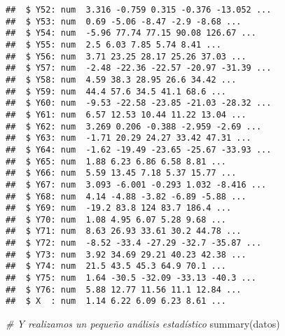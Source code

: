 \documentclass[
]{article}
\newenvironment{Shaded}{\begin{snugshade}}{\end{snugshade}}
\newcommand{\CommentTok}[1]{\textcolor[rgb]{0.56,0.35,0.01}{\textit{#1}}}
\newcommand{\FunctionTok}[1]{\textcolor[rgb]{0.00,0.00,0.00}{#1}}
\newcommand{\NormalTok}[1]{#1}
\begin{document}
\begin{verbatim}
##  $ Y52: num  3.316 -0.759 0.315 -0.376 -13.052 ...
##  $ Y53: num  0.69 -5.06 -8.47 -2.9 -8.68 ...
##  $ Y54: num  -5.96 77.74 77.15 90.08 126.67 ...
##  $ Y55: num  2.5 6.03 7.85 5.74 8.41 ...
##  $ Y56: num  3.71 23.25 28.17 25.26 37.03 ...
##  $ Y57: num  -2.48 -22.36 -22.57 -20.97 -31.39 ...
##  $ Y58: num  4.59 38.3 28.95 26.6 34.42 ...
##  $ Y59: num  44.4 57.6 34.5 41.1 68.6 ...
##  $ Y60: num  -9.53 -22.58 -23.85 -21.03 -28.32 ...
##  $ Y61: num  6.57 12.53 10.44 11.22 13.04 ...
##  $ Y62: num  3.269 0.206 -0.388 -2.959 -2.69 ...
##  $ Y63: num  -1.71 20.29 24.27 33.42 47.31 ...
##  $ Y64: num  -1.62 -19.49 -23.65 -25.67 -33.93 ...
##  $ Y65: num  1.88 6.23 6.86 6.58 8.81 ...
##  $ Y66: num  5.59 13.45 7.18 5.37 15.77 ...
##  $ Y67: num  3.093 -6.001 -0.293 1.032 -8.416 ...
##  $ Y68: num  4.14 -4.88 -3.82 -6.89 -5.88 ...
##  $ Y69: num  -19.2 83.8 124 83.7 186.4 ...
##  $ Y70: num  1.08 4.95 6.07 5.28 9.68 ...
##  $ Y71: num  8.63 26.93 33.61 30.2 44.78 ...
##  $ Y72: num  -8.52 -33.4 -27.29 -32.7 -35.87 ...
##  $ Y73: num  3.92 34.69 29.21 40.23 42.38 ...
##  $ Y74: num  21.5 43.5 45.3 64.9 70.1 ...
##  $ Y75: num  1.64 -30.5 -32.09 -33.13 -40.3 ...
##  $ Y76: num  5.88 12.77 11.56 11.1 12.84 ...
##  $ X  : num  1.14 6.22 6.09 6.23 8.61 ...
\end{verbatim}

\begin{Shaded}
\begin{Highlighting}[]
\CommentTok{\# Y realizamos un pequeño análisis estadístico}
\FunctionTok{summary}\NormalTok{(datos)}
\end{Highlighting}
\end{Shaded}
\end{document}

